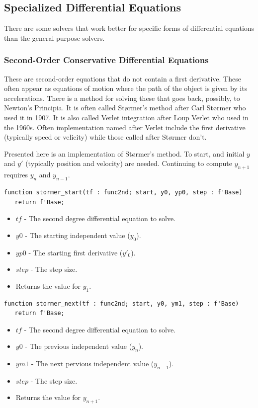 \documentclass[10pt, openany]{book}
\newcommand{\indexfunc}[1]{\index[func]{#1}}
\begin{document}
\subsection{Specialized Differential Equations}
There are some solvers that work better for specific forms of differential equations than the general purpose solvers.
\subsubsection{Second-Order Conservative Differential Equations}
These are second-order equations that do not contain a first derivative.  These often appear as equations of motion where the path of the object is given by its accelerations.  There is a method for solving these that goes back, possibly, to Newton's Principia.  It is often called St\o rmer's method after Carl St\o rmer who used it in 1907.  It is also called Verlet integration after Loup Verlet who used in the 1960s.  Often implementation named after Verlet include the first derivative (typically speed or velicity) while those called after St\o rmer don't.

Presented here is an implementation of St\o rmer's method.  To start, and initial $y$ and $y'$ (typically position and velocity) are needed.  Continuing to compute $y_{n+1}$ requires $y_n$ and $y_{n-1}$.

\begin{lstlisting}
function stormer_start(tf : func2nd; start, y0, yp0, step : f'Base)
   return f'Base;
\end{lstlisting}
\indexfunc{ode-stormer\_start}
\begin{itemize}
  \item $tf$ - The second degree differential equation to solve.
  \item $y0$ - The starting independent value ($y_0$).
  \item $yp0$ - The starting first derivative ($y'_0$).
  \item $step$ - The step size.
  \item Returns the value for $y_1$.
\end{itemize}

\begin{lstlisting}
function stormer_next(tf : func2nd; start, y0, ym1, step : f'Base)
   return f'Base;
\end{lstlisting}
\indexfunc{ode-stormer\_next}
\begin{itemize}
  \item $tf$ - The second degree differential equation to solve.
  \item $y0$ - The previous independent value ($y_n$).
  \item $ym1$ - The next pervious independent value ($y_{n-1}$).
  \item $step$ - The step size.
  \item Returns the value for $y_{n+1}$.
\end{itemize}
\end{document}
